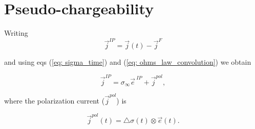 \documentclass[extra,mreferee]{gji}
\newcommand{\siginf}{\sigma_\infty}
\newcommand{\dsig}{\triangle\sigma}
\renewcommand {\j}  { {\vec j} }
\newcommand {\e}  { {\vec e} }
\begin{document}
\section{Pseudo-chargeability}
\label{section: pseudo-chargeability}
Writing
\begin{equation}
  \j^{IP} = \j(t) - \j^F
  \label{eq:jIP}
\end{equation}

and using eqs (\ref{eq: sigma_time}) and  (\ref{eq: ohms_law_convolution})  we obtain
\begin{linenomath*}
\begin{equation}
  \j^{IP} = \siginf \e^{\ IP} + \j^{pol},
  \label{eq:IP_current}
\end{equation}
\end{linenomath*}
where the polarization current ($\j^{pol}$) is
\begin{linenomath*}
\begin{equation}
  \j^{pol}(t) = \dsig(t) \otimes \e(t).
  \label{eq:polarization_current}
\end{equation}
\end{linenomath*}
\end{document}
